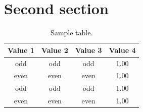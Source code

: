 \documentclass[12pt]{report}
\begin{document}
\section{Second section}

\lipsum[1]
\begin{table}[!h]
\centering
\caption{Sample table.}
\begin{tabular}{cccc}
\toprule
Value 1 & Value 2 & Value 3 & Value 4\\
\midrule
 odd     & odd   & odd & 1.00 \\
 even    & even  & even& 1.00 \\
 odd     & odd   & odd & 1.00 \\
 even    & even  & even& 1.00 \\
\bottomrule
\end{tabular}
\end{table}

\lipsum[1]

\lipsum[1]
\frameboxend
\end{document}
